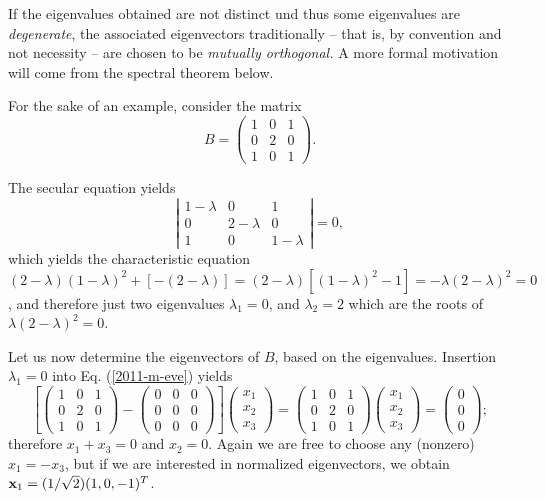 If the eigenvalues obtained are not distinct und thus some eigenvalues are {\em degenerate},
the associated eigenvectors traditionally -- that is, by convention and not necessity -- are chosen to be
{\em mutually orthogonal.}
A more formal motivation will come from the spectral theorem below.


{\color{blue}
\bexample
For the sake of an example, consider  the
{matrix}
\begin{equation}
B=
\begin{pmatrix}
1&0&1\\
0&2&0\\
1&0&1
\end{pmatrix}.
\end{equation}

The secular equation yields
$$
\left|
\begin{matrix}
1-\lambda &0&1\\
0&2-\lambda &0\\
1&0&1-\lambda
\end{matrix}
\right| = 0,
$$
which yields the characteristic equation
$
(2-\lambda )(1-\lambda )^2 +[-(2-\lambda )]=
(2-\lambda )[(1-\lambda )^2 -1]=
-\lambda (2-\lambda )^2 =0$,
and therefore just two  eigenvalues
$\lambda_1=0$,  and
$\lambda_2=2$ which are the roots of $\lambda (2-\lambda )^2 =0$.

Let us now determine the eigenvectors of $B$, based on the eigenvalues.
Insertion  $\lambda_1=0$ into Eq. (\ref{2011-m-eve})  yields
\begin{equation}
\left[
\begin{pmatrix}
1&0&1\\
0&2&0\\
1&0&1
\end{pmatrix}  -
\begin{pmatrix}
0&0&0\\
0&0&0\\
0&0&0
\end{pmatrix}
\right]
\begin{pmatrix}
x_1\\
x_2\\
x_3
\end{pmatrix}
=
\begin{pmatrix}
1&0&1\\
0&2&0\\
1&0&1
\end{pmatrix}
\begin{pmatrix}
x_1\\
x_2\\
x_3
\end{pmatrix}
=
\begin{pmatrix}
0\\
0\\
0
\end{pmatrix}
;
\end{equation}
therefore $x_1+x_3=0$ and $x_2=0$.
Again we are free to choose any (nonzero) $x_1=-x_3$,
but if we are interested in normalized eigenvectors, we obtain
${\bf x}_1 =(1/\sqrt{2})(1,0,-1)^T$.

}
